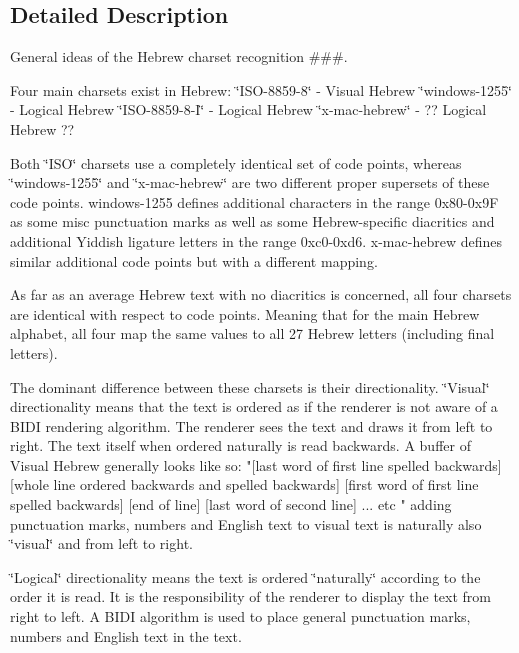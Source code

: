 \subsection{Detailed Description}
General ideas of the Hebrew charset recognition \#\#\#. 

Four main charsets exist in Hebrew\+: \char`\"{}\+I\+S\+O-\/8859-\/8\char`\"{} -\/ Visual Hebrew \char`\"{}windows-\/1255\char`\"{} -\/ Logical Hebrew \char`\"{}\+I\+S\+O-\/8859-\/8-\/\+I\char`\"{} -\/ Logical Hebrew \char`\"{}x-\/mac-\/hebrew\char`\"{} -\/ ?? Logical Hebrew ??

Both \char`\"{}\+I\+S\+O\char`\"{} charsets use a completely identical set of code points, whereas \char`\"{}windows-\/1255\char`\"{} and \char`\"{}x-\/mac-\/hebrew\char`\"{} are two different proper supersets of these code points. windows-\/1255 defines additional characters in the range 0x80-\/0x9F as some misc punctuation marks as well as some Hebrew-\/specific diacritics and additional \textquotesingle{}Yiddish\textquotesingle{} ligature letters in the range 0xc0-\/0xd6. x-\/mac-\/hebrew defines similar additional code points but with a different mapping.

As far as an average Hebrew text with no diacritics is concerned, all four charsets are identical with respect to code points. Meaning that for the main Hebrew alphabet, all four map the same values to all 27 Hebrew letters (including final letters).

The dominant difference between these charsets is their directionality. \char`\"{}\+Visual\char`\"{} directionality means that the text is ordered as if the renderer is not aware of a B\+I\+DI rendering algorithm. The renderer sees the text and draws it from left to right. The text itself when ordered naturally is read backwards. A buffer of Visual Hebrew generally looks like so\+: "\mbox{[}last word of first line spelled backwards\mbox{]} \mbox{[}whole line ordered backwards and spelled backwards\mbox{]} \mbox{[}first word of first line spelled backwards\mbox{]} \mbox{[}end of line\mbox{]} \mbox{[}last word of second line\mbox{]} ... etc\textquotesingle{} " adding punctuation marks, numbers and English text to visual text is naturally also \char`\"{}visual\char`\"{} and from left to right.

\char`\"{}\+Logical\char`\"{} directionality means the text is ordered \char`\"{}naturally\char`\"{} according to the order it is read. It is the responsibility of the renderer to display the text from right to left. A B\+I\+DI algorithm is used to place general punctuation marks, numbers and English text in the text.


